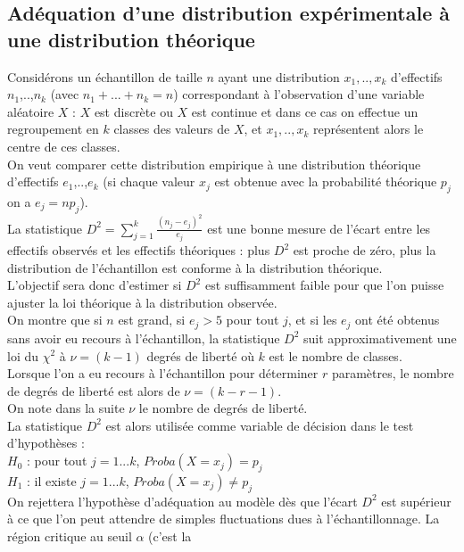 \documentclass[a4paper,11pt]{book}
\begin{document}
\subsection{Ad\'equation d'une distribution exp\'erimentale \`a une distribution th\'eorique}
Consid\'erons un \'echantillon de taille $n$ ayant une distribution 
 $x_1,..,x_k$ d'effectifs 
$n_1$,..,$n_k$  (avec $n_1+...+n_k=n$) correspondant \`a l'observation d'une 
variable al\'eatoire $X$ : $X$ est discr\`ete ou $X$ est continue et dans ce 
cas on effectue un regroupement en $k$ classes des valeurs de $X$,
et $x_1,..,x_k$ repr\'esentent alors le centre de ces classes.\\
On veut comparer cette distribution empirique \`a une distribution th\'eorique
d'effectifs $e_1$,..,$e_k$ (si chaque valeur $x_j$ est obtenue avec la 
probabilit\'e th\'eorique $p_j$ on a $e_j=np_j$).\\
La statistique $\displaystyle D^2=\sum_{j=1}^k\frac{(n_j-e_j)^2}{e_j}$ est une 
bonne mesure de l'\'ecart entre les effectifs observ\'es et les effectifs 
th\'eoriques : plus $D^2$ est proche de z\'ero, plus la distribution de 
l'\'echantillon est conforme \`a la distribution th\'eorique.\\
L'objectif sera donc d'estimer si $D^2$ est suffisamment faible pour que l'on 
puisse ajuster la loi th\'eorique \`a la distribution observ\'ee.\\
On montre que si $n$ est grand, si $e_j>5$ pour tout $j$, et si les $e_j$ 
ont \'et\'e obtenus sans avoir eu recours \`a l'\'echantillon, la statistique
$D^2$ suit approximativement  une loi  du $\chi^2$ \`a $\nu=(k-1)$ degr\'es de 
libert\'e o\`u $k$ est le nombre de classes.\\
Lorsque l'on a eu recours \`a l'\'echantillon pour d\'eterminer $r$ 
param\`etres, le nombre de degr\'es de libert\'e est alors de $\nu=(k-r-1)$.\\
On note dans la suite $\nu$ le nombre de degr\'es de libert\'e.\\
La statistique $D^2$ est alors utilis\'ee comme variable de d\'ecision dans le 
test d'hypoth\`eses : \\
$H_0$ : pour tout $j=1...k$, $Proba(X=x_j)=p_j$\\
$H_1$ : il existe $j=1...k$, $Proba(X=x_j)\neq p_j$\\
On rejettera l'hypoth\`ese d'ad\'equation au mod\`ele d\`es que l'\'ecart $D^2$
 est sup\'erieur \`a ce que l'on peut attendre de simples fluctuations dues 
\`a l'\'echantillonnage. La r\'egion critique au seuil $\alpha$ (c'est la 
\end{document}
